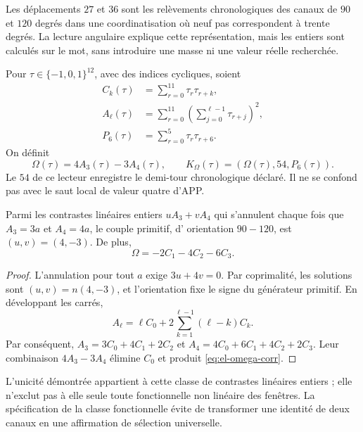 Les déplacements \(27\) et \(36\) sont les relèvements
chronologiques des canaux de \(90\) et \(120\) degrés dans une coordinatisation
où neuf pas correspondent à trente degrés. La lecture angulaire
explique cette représentation, mais les entiers sont calculés sur le
mot, sans introduire une masse ni une valeur réelle recherchée.

\begin{definition}
Pour \(\tau\in\{-1,0,1\}^{12}\), avec des indices cycliques, soient
\begin{align*}
 C_k(\tau)&=\sum_{r=0}^{11}\tau_r\tau_{r+k},\\
 A_\ell(\tau)&=\sum_{r=0}^{11}
           \left(\sum_{j=0}^{\ell-1}\tau_{r+j}\right)^2,\\
 P_6(\tau)&=\sum_{r=0}^{5}\tau_r\tau_{r+6}.
\end{align*}
On définit
\begin{equation}
 \Omega(\tau)=4A_3(\tau)-3A_4(\tau),\qquad
 K_\Omega(\tau)=(\Omega(\tau),54,P_6(\tau)).
 \label{eq:el-komega}
\end{equation}
Le \(54\) de ce lecteur enregistre le demi-tour chronologique déclaré.
Il ne se confond pas avec le saut local de valeur quatre d'APP.
\end{definition}

\begin{lemma}
Parmi les contrastes linéaires entiers \(uA_3+vA_4\) qui s'annulent
chaque fois que \(A_3=3a\) et \(A_4=4a\), le couple primitif, d'
orientation \(90-120\), est \((u,v)=(4,-3)\). De plus,
\begin{equation}
 \Omega=-2C_1-4C_2-6C_3.
 \label{eq:el-omega-corr}
\end{equation}
\end{lemma}
\begin{proof}
L'annulation pour tout \(a\) exige \(3u+4v=0\). Par coprimalité, les solutions sont \((u,v)=n(4,-3)\), et l'orientation fixe le signe du générateur primitif. En développant les carrés,
\[
 A_\ell=\ell C_0+2\sum_{k=1}^{\ell-1}(\ell-k)C_k.
\]
Par conséquent,
\(A_3=3C_0+4C_1+2C_2\) et
\(A_4=4C_0+6C_1+4C_2+2C_3\). Leur combinaison \(4A_3-3A_4\)
élimine \(C_0\) et produit \eqref{eq:el-omega-corr}.
\end{proof}

L'unicité démontrée appartient à cette classe de contrastes linéaires
entiers ; elle n'exclut pas à elle seule toute fonctionnelle non linéaire des fenêtres.
La spécification de la classe fonctionnelle évite de transformer une identité
de deux canaux en une affirmation de sélection universelle.

